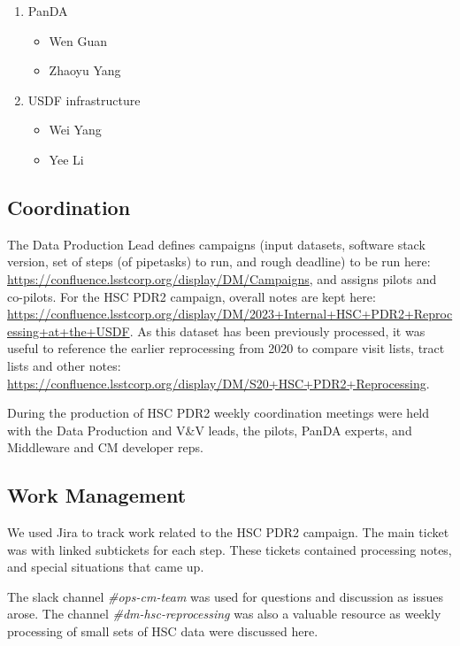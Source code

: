 \begin{enumerate}
\item PanDA
\begin{itemize}
\item Wen Guan
\item Zhaoyu Yang
\end{itemize}

\item USDF infrastructure
\begin{itemize}
\item Wei Yang
\item Yee Li
\end{itemize}

\end{enumerate}

\subsection{Coordination}

The Data Production Lead defines campaigns (input datasets, software stack version, set of
steps (of pipetasks) to run, and rough deadline) to be run 
here: \url{https://confluence.lsstcorp.org/display/DM/Campaigns}, and assigns pilots and co-pilots.
For the HSC PDR2 campaign, overall notes are kept here: \url{https://confluence.lsstcorp.org/display/DM/2023+Internal+HSC+PDR2+Reprocessing+at+the+USDF}.   As this dataset has been previously processed, it was useful
to reference the earlier reprocessing from 2020 to compare visit lists, tract lists and other notes:
\url{https://confluence.lsstcorp.org/display/DM/S20+HSC+PDR2+Reprocessing}.

During the production of HSC PDR2 weekly coordination meetings were held with the Data Production 
and V\&V leads, the pilots, PanDA experts, and Middleware and CM developer reps. 

\subsection{Work Management}

We used Jira to track work related to the HSC PDR2 campaign.
The main ticket was  with linked subtickets for each step.
These tickets contained processing notes, and special situations that came up.

The slack channel {\it\#ops-cm-team} was used for questions and discussion as issues arose.
The channel {\it\#dm-hsc-reprocessing} was also a valuable resource as weekly processing of small
sets of HSC data were discussed here.

